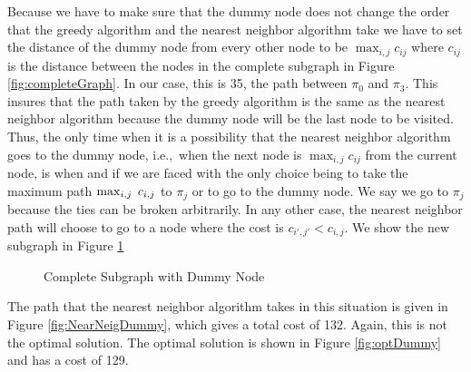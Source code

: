 Because we have to make sure that the dummy node does not change the order that the greedy algorithm and the nearest neighbor algorithm take we have to set the distance of the dummy node from every other node to be $\max_{i,j} c_{ij} $ where $c_{ij}$ is the distance between the nodes in the complete subgraph in Figure \ref{fig:completeGraph}. In our case, this is 35, the path between $\pi_0$ and $\pi_3$. This insures that the path taken by the greedy algorithm is the same as the nearest neighbor algorithm because the dummy node will be the last node to be visited. Thus, the only time when it is a possibility that the nearest neighbor algorithm goes to the dummy node, i.e.,\ when the next node is $\max_{i,j} c_{ij}$ from the current node, is when and if we are faced with the only choice being to take the maximum path $ \max_{i,j} \hspace{0.1cm} c_{i,j}$ to $\pi_j$ or to go to the dummy node. We say we go to $\pi_j$ because the ties can be broken arbitrarily. In any other case, the nearest neighbor path will choose to go to a node where the cost is $c_{i',j'} < c_{i,j}$. We show the new subgraph in Figure \ref{fig:completeDummy}

\begin{figure}
\centering
{}
\caption{Complete Subgraph with Dummy Node}
\label{fig:completeDummy}
\end{figure}

The path that the nearest neighbor algorithm takes in this situation is given in Figure \ref{fig:NearNeigDummy}, which gives a total cost of 132. Again, this is not the optimal solution. The optimal solution is shown in Figure \ref{fig:optDummy} and has a cost of 129.

